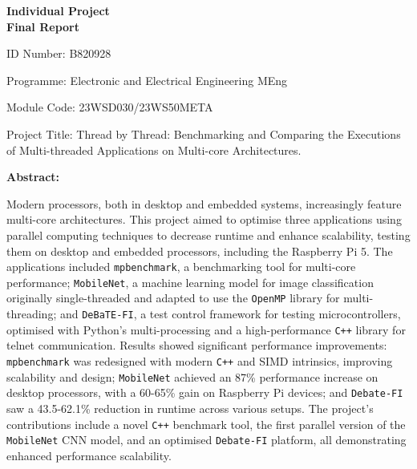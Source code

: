 \documentclass[12pt, openany]{book}
\begin{document}
\begin{titlepage}
	\centering
	\vspace*{1cm} %
	{\Huge\bfseries Individual Project\\[0.5cm] Final Report\par}
	\vspace{2cm}
	\raggedright
	ID Number: B820928\par
	
	Programme: Electronic and Electrical Engineering MEng\par
	
	Module Code: 23WSD030/23WS50META\par
	
	Project Title: Thread by Thread: Benchmarking and Comparing the Executions of Multi-threaded Applications on Multi-core Architectures.\par
	
	\textbf{Abstract:}\par %

	Modern processors, both in desktop and embedded systems, increasingly feature multi-core architectures. This project aimed to optimise three applications using parallel computing techniques to decrease runtime and enhance scalability, testing them on desktop and embedded processors, including the Raspberry Pi 5. The applications included \texttt{mpbenchmark}, a benchmarking tool for multi-core performance; \texttt{MobileNet}, a machine learning model for image classification originally single-threaded and adapted to use the \texttt{OpenMP} library for multi-threading; and \texttt{DeBaTE-FI}, a test control framework for testing microcontrollers, optimised with Python’s multi-processing and a high-performance \texttt{C++} library for telnet communication. Results showed significant performance improvements: \texttt{mpbenchmark} was redesigned with modern \texttt{C++} and SIMD intrinsics, improving scalability and design; \texttt{MobileNet} achieved an 87\% performance increase on desktop processors, with a 60-65\% gain on Raspberry Pi devices; and \texttt{Debate-FI} saw a 43.5-62.1\% reduction in runtime across various setups. The project's contributions include a novel \texttt{C++} benchmark tool, the first parallel version of the \texttt{MobileNet} CNN model, and an optimised \texttt{Debate-FI} platform, all demonstrating enhanced performance scalability.

\end{titlepage}
\end{document}
